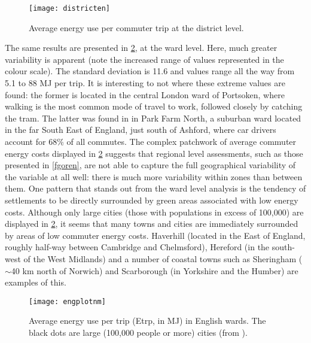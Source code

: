 \begin{figure}[htbp]
\begin{center}
    \texttt{[image: districten]}  \end{center}
  \caption[Average energy use per commuter trip at the district level]
  {Average energy use per commuter trip at the district level.}
 \label{fdistricten}
\end{figure}

The same results are presented in \cref{fengplotnm}, at the ward level.
Here, much greater variability is apparent (note the increased range of
values represented in the colour scale). The standard deviation is 11.6
and values range all the way from 5.1 to 88 MJ per trip.
It is interesting to not where these extreme values are found:
the former is located in the central London ward of
Portsoken, where walking is the most common mode of travel to work,
followed closely by catching the tram. The latter was
found in in Park Farm North,
a suburban ward located in the far South East of England, just south of
Ashford, where car drivers account for 68\% of all commutes. The complex
patchwork of average  commuter energy costs displayed in \cref{fengplotnm}
suggests that regional level assessments, such as those
presented in \cref{fgoren}, are not able to capture the full geographical
variability of the variable at all well: there is much more variability
within zones than between them. One pattern that stands out from the ward level
analysis is the tendency of settlements to be directly surrounded by green areas
associated with low energy costs. Although only large cities (those with
populations in excess of 100,000) are displayed in
\cref{fengplotnm}, it seems that many towns and cities are immediately surrounded
by areas of low commuter energy costs. Haverhill (located in the East of
England, roughly half-way between Cambridge and Chelmsford),
Hereford (in the south-west of the West Midlands) and a number of coastal
towns such as  Sheringham ($\sim$40 km north of Norwich) and Scarborough
(in Yorkshire and the Humber) are examples of this.
\begin{figure}[htbp]
\begin{center}
    \texttt{[image: engplotnm]}  \end{center}
  \caption[Average energy use per trip (Etrp, in MJ) in English wards]
  {Average energy use per trip (Etrp, in MJ) in English wards.
  The black dots are large (100,000 people or more) cities (from
  \citet{Brownrigg2013}).}
 \label{fengplotnm}
\end{figure}

